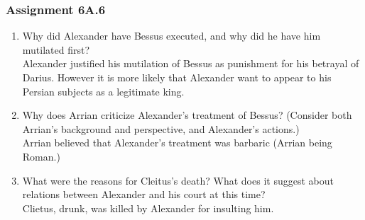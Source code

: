 \documentclass{article}
\begin{document}
\subsubsection*{Assignment 6A.6}
\begin{enumerate}
  \item Why did Alexander have Bessus executed, and why did he have him mutilated first? \\
  Alexander justified his mutilation of Bessus as punishment for his betrayal of Darius. However
  it is more likely that Alexander want to appear to his Persian subjects as a legitimate king.
  \item Why does Arrian criticize Alexander’s treatment of Bessus? (Consider both Arrian’s
  background and perspective, and Alexander’s actions.) \\
  Arrian believed that Alexander's treatment was barbaric (Arrian being Roman.)
  \item What were the reasons for Cleitus’s death? What does it suggest about relations
  between Alexander and his court at this time? \\
  Clietus, drunk, was killed by Alexander for insulting him.
\end{enumerate}
\end{document}
